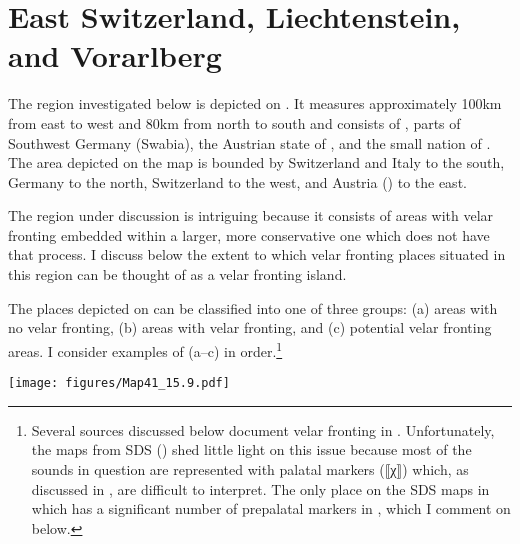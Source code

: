 \section{{East} {Switzerland,} {Liechtenstein,} {and} {Vorarlberg}}\label{sec:15.11}

The region investigated below is depicted on .  It measures approximately 100km from east to west and 80km from north to south and consists of , parts of Southwest Germany (Swabia), the Austrian state of , and the small nation of . The area depicted on the map is bounded by Switzerland and Italy to the south, Germany to the north, Switzerland to the west, and Austria () to the east.

The region under discussion is intriguing because it consists of areas with velar fronting embedded within a larger, more conservative one which does not have that process. I discuss below the extent to which velar fronting places situated in this region can be thought of as a velar fronting island.

The places depicted on  can be classified into one of three groups: (a) areas with no velar fronting, (b) areas with velar fronting, and (c) potential velar fronting areas. I consider examples of (a--c) in order.\footnote{Several sources discussed below document velar fronting in . Unfortunately, the maps from SDS () shed little light on this issue because most of the sounds in question are represented with palatal markers (⟦χ⟧) which, as discussed in , are difficult to interpret. The only place on the SDS maps in  which has a significant number of prepalatal markers in , which I comment on below.}

\begin{map}[ph]
\texttt{[image: figures/Map41\_15.9.pdf]}
\caption[{East Switzerland}, {Liechtenstein}, {Vorarlberg}, and West {Tyrol}]{{East Switzerland}, {Liechtenstein}, {Vorarlberg}, and West {Tyrol}. Circles indicate no postsonorant velar fronting, white squares (assimilatory) velar fronting, and diagonal squares (potential) velar fronting. 1=\citet{Vetsch1910}, 2=\citet{Hausknecht1911}, 3=\citet{Berger1913}, 4=\citet{Wiget1916}, 5=\citet{Meinherz1920}, 6=\citet{Jutz1922}, 7=\citet{Jutz1925}, 8=\citet{Trüb1951}, 9=\citet{Gabriel1963}, 10=\citet{BethgeBonnin1969}, 11=VALTS, 12=SDS.}\label{map:41}
\end{map}

